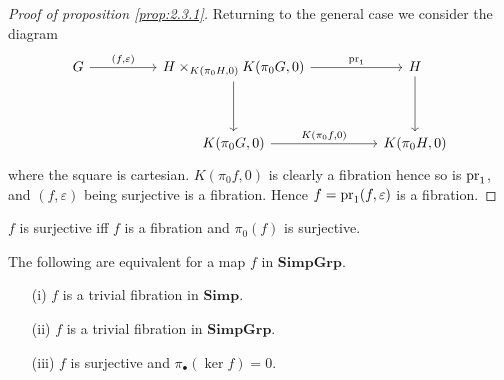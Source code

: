 \documentclass[../main]{subfiles}
\begin{document}
\begin{proof}[Proof of proposition \ref{prop:2.3.1}]
Returning to the general case we consider the diagram
\[\begin{tikzcd}
	G && {H \times_{K(\pi_{0}H, 0)}K(\pi_{0}G, 0)} && H \\
	\\
	&& {K(\pi_{0}G, 0)} && {K(\pi_{0}H, 0)}
	\arrow[from=1-5, to=3-5]
	\arrow[from=1-3, to=3-3]
	\arrow["{K(\pi_{0}f, 0)}", from=3-3, to=3-5]
	\arrow["{\pr_{1}}", from=1-3, to=1-5]
	\arrow["{(f, \varepsilon)}", from=1-1, to=1-3]
\end{tikzcd}\]
where the square is cartesian. $K(\pi_{0}f, 0)$ is clearly a fibration hence so is $\operatorname{pr}_{1}$, and $(f, \varepsilon)$ being surjective is a fibration. Hence $f = \operatorname{pr}_{1}(f, \varepsilon)$ is a fibration.
\end{proof}

\begin{corollary*}
$f$ is surjective iff $f$ is a fibration and $\pi_{0}(f)$ is surjective.
\end{corollary*}

\begin{proposition}
\label{prop:2.3.2}
The following are equivalent for a map $f$ in \(\mathbf{Simp Grp}\).
\begin{enumerate}
    \item[(i)] $f$ is a trivial fibration in $\mathbf{Simp}$.
    \item[(ii)] $f$ is a trivial fibration in \(\mathbf{Simp Grp}\).
    \item[(iii)] $f$ is surjective and $\pi_{\bullet}(\ker f) = 0$.
\end{enumerate}
\end{proposition}
\end{document}
